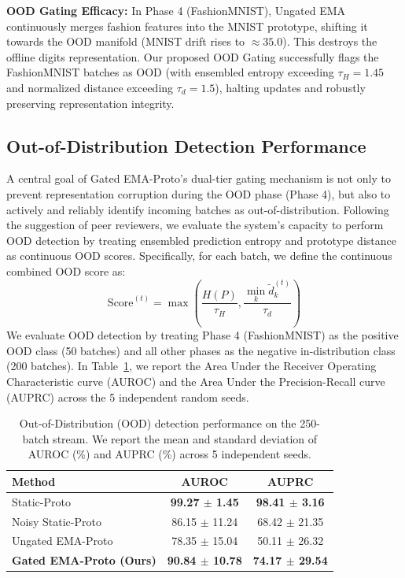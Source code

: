 \documentclass{article}
\theoremstyle{plain}
\theoremstyle{definition}
\theoremstyle{remark}
\begin{document}
\textbf{OOD Gating Efficacy:} In Phase 4 (FashionMNIST), Ungated EMA continuously merges fashion features into the MNIST prototype, shifting it towards the OOD manifold (MNIST drift rises to $\approx 35.0$). This destroys the offline digits representation. Our proposed OOD Gating successfully flags the FashionMNIST batches as OOD (with ensembled entropy exceeding $\tau_H=1.45$ and normalized distance exceeding $\tau_d=1.5$), halting updates and robustly preserving representation integrity.

\subsection{Out-of-Distribution Detection Performance}
\label{sec:ood_detection}
A central goal of Gated EMA-Proto's dual-tier gating mechanism is not only to prevent representation corruption during the OOD phase (Phase 4), but also to actively and reliably identify incoming batches as out-of-distribution. Following the suggestion of peer reviewers, we evaluate the system's capacity to perform OOD detection by treating ensembled prediction entropy and prototype distance as continuous OOD scores. Specifically, for each batch, we define the continuous combined OOD score as:
\begin{equation}
    \text{Score}^{(t)} = \max \left( \frac{H(P)}{\tau_H}, \frac{\min_k \tilde{d}_k^{(t)}}{\tau_d} \right)
\end{equation}
We evaluate OOD detection by treating Phase 4 (FashionMNIST) as the positive OOD class (50 batches) and all other phases as the negative in-distribution class (200 batches). In Table~\ref{tab:ood_metrics}, we report the Area Under the Receiver Operating Characteristic curve (AUROC) and the Area Under the Precision-Recall curve (AUPRC) across the 5 independent random seeds.

\begin{table}[h]
\caption{Out-of-Distribution (OOD) detection performance on the 250-batch stream. We report the mean and standard deviation of AUROC (\%) and AUPRC (\%) across 5 independent seeds.}
\label{tab:ood_metrics}
\vskip 0.1in
\begin{center}
\begin{small}
\begin{sc}
\setlength{\tabcolsep}{2.5pt}
\begin{tabular}{lcc}
\toprule
Method & AUROC & AUPRC \\
\midrule
Static-Proto & \textbf{99.27 $\pm$ 1.45} & \textbf{98.41 $\pm$ 3.16} \\
Noisy Static-Proto & 86.15 $\pm$ 11.24 & 68.42 $\pm$ 21.35 \\
Ungated EMA-Proto & 78.35 $\pm$ 15.04 & 50.11 $\pm$ 26.32 \\
\textbf{Gated EMA-Proto (Ours)} & \textbf{90.84 $\pm$ 10.78} & \textbf{74.17 $\pm$ 29.54} \\
\bottomrule
\end{tabular}
\end{sc}
\end{small}
\end{center}
\end{table}
\end{document}
